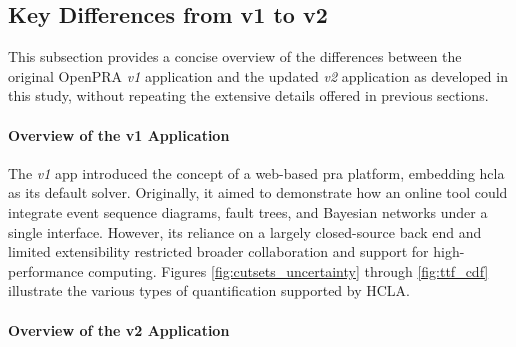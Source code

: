 \subsection{Key Differences from v1 to v2}
\label{sec:distinguish-v1-v2}
This subsection provides a concise overview of the differences between the original OpenPRA \textit{v1} application and the updated \textit{v2} application as developed in this study, without repeating the extensive details offered in previous sections.

\paragraph{Overview of the v1 Application}
The \textit{v1} app introduced the concept of a web-based \acrshort{pra} platform, embedding \acrshort{hcla} \cite{hcla_cmd} as its default solver. Originally, it aimed to demonstrate how an online tool could integrate event sequence diagrams, fault trees, and Bayesian networks under a single interface. However, its reliance on a largely closed-source back end and limited extensibility restricted broader collaboration and support for high-performance computing. Figures \ref{fig:cutsets_uncertainty} through \ref{fig:ttf_cdf} illustrate the various types of quantification supported by HCLA.

\paragraph{Overview of the v2 Application}

